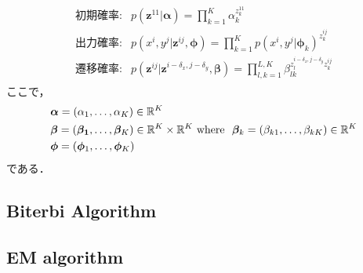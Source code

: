 \begin{align}
\begin{array}{ll}
\mbox{初期確率:}  & p(\bm{z}^{11}|\bm{\alpha})=\prod_{k=1}^K \alpha_k^{z_k^{11}}\\
\mbox{出力確率:}  & p(x^i, y^j|\bm{z}^{ij}, \bm{\phi}) = \prod_{k=1}^K p(x^i, y^j|\bm{\phi}_k)^{z^{ij}_k}\\
\mbox{遷移確率:}  & p(\bm{z}^{ij}|\bm{z}^{i-\delta_x, j-\delta_y}, \bm{\beta}) =  \prod_{l,k=1}^{L,K} \beta_{lk}^{z^{i-\delta_x,j-\delta_y}_l z^{ij}_k}
\end{array}
\end{align}
ここで，
\begin{align}
&\bm{\alpha} = (\alpha_1, \ldots, \alpha_K)\in\mathbb{R}^K\label{eq:res_a}\\
&\bm{\beta} =  (\bm{\beta_1}, \ldots ,\bm{\beta}_K)\in\mathbb{R}^K\times\mathbb{R}^K \mbox{ where } \ \bm{\beta}_k=(\beta_{k1},\ldots, \beta_{kK})\in\mathbb{R}^K\label{eq:res_b}\\
&\bm{\phi}  = (\bm{\phi}_1,\ldots,\bm{\phi}_K)
\end{align}
である．

\subsection{Biterbi Algorithm}

\subsection{EM algorithm}

